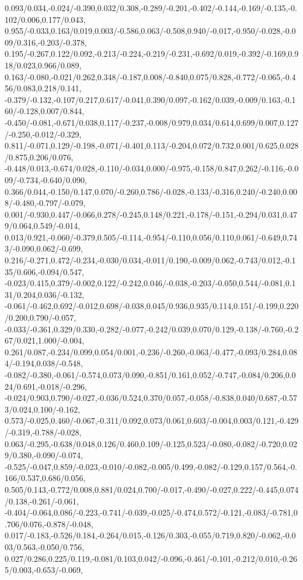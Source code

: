 {0.093/0.034,-0.024/-0.390,0.032/0.308,-0.289/-0.201,-0.402/-0.144,-0.169/-0.135,-0.102/0.006,0.177/0.043,%
0.955/-0.033,0.163/0.019,0.003/-0.586,0.063/-0.508,0.940/-0.017,-0.950/-0.028,-0.009/0.316,-0.203/-0.378,%
0.195/-0.267,0.122/0.092,-0.213/-0.224,-0.219/-0.231,-0.692/0.019,-0.392/-0.169,0.918/0.023,0.966/0.089,%
0.163/-0.080,-0.021/0.262,0.348/-0.187,0.008/-0.840,0.075/0.828,-0.772/-0.065,-0.456/0.083,0.218/0.141,%
-0.379/-0.132,-0.107/0.217,0.617/-0.041,0.390/0.097,-0.162/0.039,-0.009/0.163,-0.160/-0.128,0.007/0.844,%
-0.450/-0.081,-0.671/0.038,0.117/-0.237,-0.008/0.979,0.034/0.614,0.699/0.007,0.127/-0.250,-0.012/-0.329,%
0.811/-0.071,0.129/-0.198,-0.071/-0.401,0.113/-0.204,0.072/0.732,0.001/0.625,0.028/0.875,0.206/0.076,%
-0.448/0.013,-0.674/0.028,-0.110/-0.034,0.000/-0.975,-0.158/0.847,0.262/-0.116,-0.009/-0.734,-0.640/0.090,%
0.366/0.044,-0.150/0.147,0.070/-0.260,0.786/-0.028,-0.133/-0.316,0.240/-0.240,0.008/-0.480,-0.797/-0.079,%
0.001/-0.930,0.447/-0.066,0.278/-0.245,0.148/0.221,-0.178/-0.151,-0.294/0.031,0.479/0.064,0.549/-0.014,%
0.013/0.921,-0.060/-0.379,0.505/-0.114,-0.954/-0.110,0.056/0.110,0.061/-0.649,0.743/-0.090,0.062/-0.699,%
0.216/-0.271,0.472/-0.234,-0.030/0.034,-0.011/0.190,-0.009/0.062,-0.743/0.012,-0.135/0.606,-0.094/0.547,%
-0.023/0.415,0.379/-0.002,0.122/-0.242,0.046/-0.038,-0.203/-0.050,0.544/-0.081,0.131/0.204,0.036/-0.132,%
-0.061/-0.462,0.692/-0.012,0.698/-0.038,0.045/0.936,0.935/0.114,0.151/-0.199,0.220/0.200,0.790/-0.057,%
-0.033/-0.361,0.329/0.330,-0.282/-0.077,-0.242/0.039,0.070/0.129,-0.138/-0.760,-0.267/0.021,1.000/-0.004,%
0.261/0.087,-0.234/0.099,0.054/0.001,-0.236/-0.260,-0.063/-0.477,-0.093/0.284,0.084/-0.194,0.038/-0.548,%
-0.082/-0.380,-0.061/-0.574,0.073/0.090,-0.851/0.161,0.052/-0.747,-0.084/0.206,0.024/0.691,-0.018/-0.296,%
-0.024/0.903,0.790/-0.027,-0.036/0.524,0.370/0.057,-0.058/-0.838,0.040/0.687,-0.573/0.024,0.100/-0.162,%
0.573/-0.025,0.460/-0.067,-0.311/0.092,0.073/0.061,0.603/-0.004,0.003/0.121,-0.429/-0.319,-0.788/-0.028,%
0.063/-0.295,-0.638/0.048,0.126/0.460,0.109/-0.125,0.523/-0.080,-0.082/-0.720,0.029/0.380,-0.090/-0.074,%
-0.525/-0.047,0.859/-0.023,-0.010/-0.082,-0.005/0.499,-0.082/-0.129,0.157/0.564,-0.166/0.537,0.686/0.056,%
0.505/0.143,-0.772/0.008,0.881/0.024,0.700/-0.017,-0.490/-0.027,0.222/-0.445,0.074/0.138,-0.261/-0.061,%
-0.404/-0.064,0.086/-0.223,-0.741/-0.039,-0.025/-0.474,0.572/-0.121,-0.083/-0.781,0.706/0.076,-0.878/-0.048,%
0.017/-0.183,-0.526/0.184,-0.264/0.015,-0.126/0.303,-0.055/0.719,0.820/-0.062,-0.003/0.563,-0.050/0.756,%
0.027/0.286,0.225/0.119,-0.081/0.103,0.042/-0.096,-0.461/-0.101,-0.212/0.010,-0.265/0.003,-0.653/-0.069,%
}
